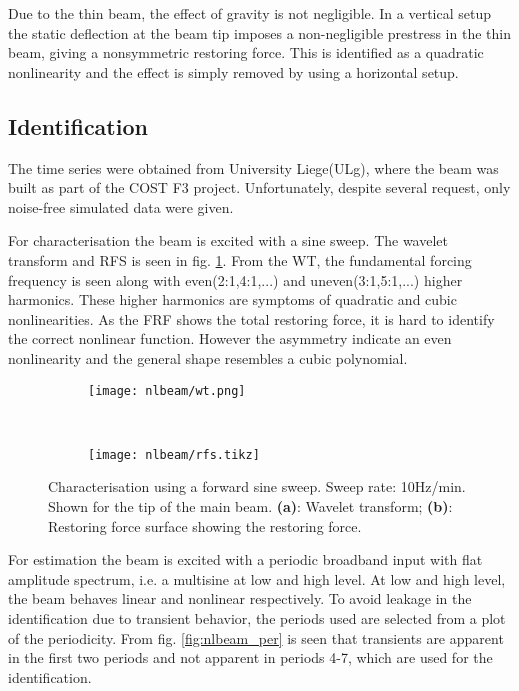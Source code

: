 Due to the thin beam, the effect of gravity is not negligible. In a vertical
setup the static deflection at the beam tip imposes a non-negligible prestress
in the thin beam, giving a nonsymmetric restoring force. This is identified as a
quadratic nonlinearity and the effect is simply removed by using a horizontal
setup.

\subsection{Identification}

The time series were obtained from University Liege(ULg), where the beam was
built as part of the COST F3 project. Unfortunately, despite several request,
only noise-free simulated data were given.

For characterisation the beam is excited with a sine sweep. The wavelet
transform and RFS is seen in fig. \ref{fig:nlbeam_characterisation}. From the
WT, the fundamental forcing frequency is seen along with even(2:1,4:1,...) and
uneven(3:1,5:1,...) higher harmonics. These higher harmonics are symptoms of
quadratic and cubic nonlinearities.
As the FRF shows the total restoring force, it is hard to identify the correct
nonlinear function. However the asymmetry indicate an even nonlinearity and the general
shape resembles a cubic polynomial.

\begin{figure}
  \centering
  \begin{subfigure}[b]{0.45\textwidth}
    \texttt{[image: nlbeam/wt.png]}
    \caption{}
  \end{subfigure}
  ~
  \begin{subfigure}[b]{0.45\textwidth}
    \texttt{[image: nlbeam/rfs.tikz]}
    \caption{}
  \end{subfigure}
  \caption{Characterisation using a forward sine sweep. Sweep rate: 10Hz/min.
    Shown for the tip of the main beam.
    \textbf{(a)}: Wavelet transform;
    \textbf{(b)}: Restoring force surface showing the restoring force.}
  \label{fig:nlbeam_characterisation}
\end{figure}


For estimation the beam is excited with a periodic broadband input with flat
amplitude spectrum, i.e. a multisine at low and high level. At low and high
level, the beam behaves linear and nonlinear respectively. To avoid leakage in
the identification due to transient behavior, the periods used are selected from
a plot of the periodicity. From fig. \ref{fig:nlbeam_per} is seen that
transients are apparent in the first two periods and not apparent in periods
4-7, which are used for the identification.

